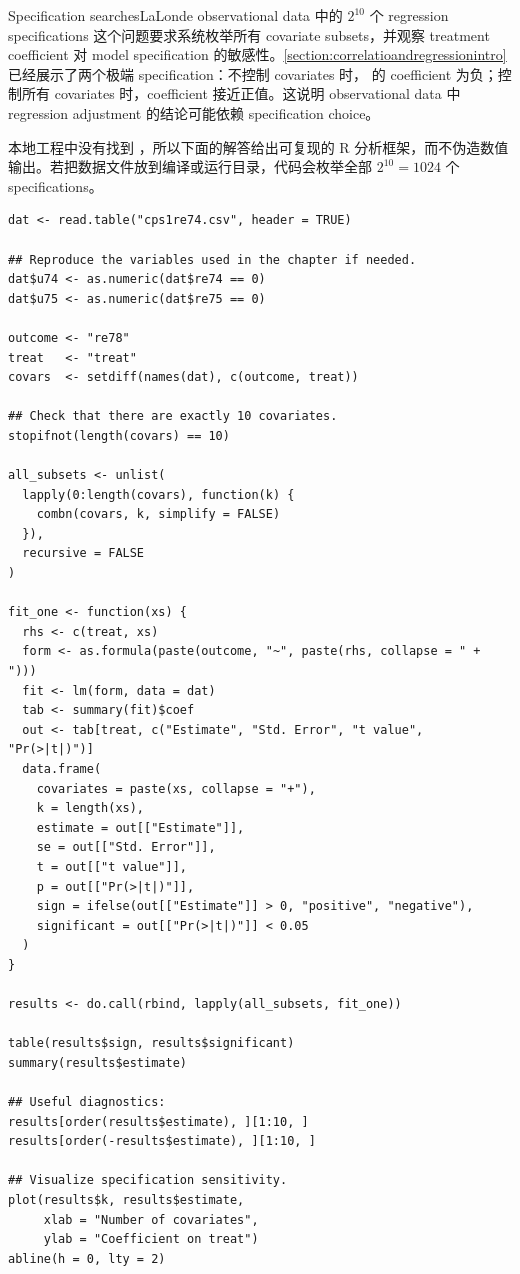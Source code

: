 \begin{exercisesolution}{Specification searches}{LaLonde observational data 中的 $2^{10}$ 个 regression specifications}
这个问题要求系统枚举所有 covariate subsets，并观察 treatment coefficient 对 model specification 的敏感性。\cref{section:correlatioandregressionintro} 已经展示了两个极端 specification：不控制 covariates 时， 的 coefficient 为负；控制所有 covariates 时，coefficient 接近正值。这说明 observational data 中 regression adjustment 的结论可能依赖 specification choice。

本地工程中没有找到 ，所以下面的解答给出可复现的 R 分析框架，而不伪造数值输出。若把数据文件放到编译或运行目录，代码会枚举全部 $2^{10}=1024$ 个 specifications。

\begin{lstlisting}
dat <- read.table("cps1re74.csv", header = TRUE)

## Reproduce the variables used in the chapter if needed.
dat$u74 <- as.numeric(dat$re74 == 0)
dat$u75 <- as.numeric(dat$re75 == 0)

outcome <- "re78"
treat   <- "treat"
covars  <- setdiff(names(dat), c(outcome, treat))

## Check that there are exactly 10 covariates.
stopifnot(length(covars) == 10)

all_subsets <- unlist(
  lapply(0:length(covars), function(k) {
    combn(covars, k, simplify = FALSE)
  }),
  recursive = FALSE
)

fit_one <- function(xs) {
  rhs <- c(treat, xs)
  form <- as.formula(paste(outcome, "~", paste(rhs, collapse = " + ")))
  fit <- lm(form, data = dat)
  tab <- summary(fit)$coef
  out <- tab[treat, c("Estimate", "Std. Error", "t value", "Pr(>|t|)")]
  data.frame(
    covariates = paste(xs, collapse = "+"),
    k = length(xs),
    estimate = out[["Estimate"]],
    se = out[["Std. Error"]],
    t = out[["t value"]],
    p = out[["Pr(>|t|)"]],
    sign = ifelse(out[["Estimate"]] > 0, "positive", "negative"),
    significant = out[["Pr(>|t|)"]] < 0.05
  )
}

results <- do.call(rbind, lapply(all_subsets, fit_one))

table(results$sign, results$significant)
summary(results$estimate)

## Useful diagnostics:
results[order(results$estimate), ][1:10, ]
results[order(-results$estimate), ][1:10, ]

## Visualize specification sensitivity.
plot(results$k, results$estimate,
     xlab = "Number of covariates",
     ylab = "Coefficient on treat")
abline(h = 0, lty = 2)
\end{lstlisting}


\end{exercisesolution}
